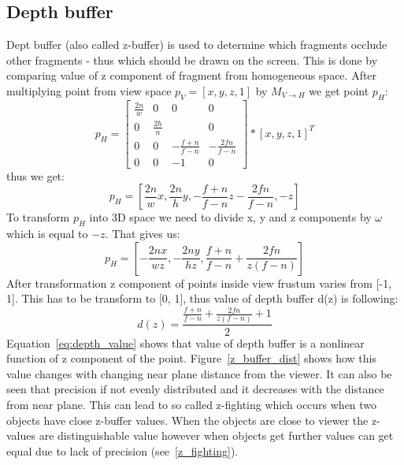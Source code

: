 \subsection{Depth buffer}
Dept buffer (also called z-buffer) is used to determine which fragments occlude other fragments - thus which should be drawn on the screen. This is done by comparing value of z component of fragment from homogeneous space. 
After multiplying point from view space $p_V = [x, y, z, 1]$  by $M_{V \to H}$ we get point $p_H$:
\begin{equation}
\label{eg:projection_transformation}
p_H =
\begin{bmatrix}
\frac{2n}{w} & 0            & 0                & 0                \\ 
0            & \frac{2h}{n} &                  & 0                 \\ 
0            & 0            & -\frac{f+n}{f-n} & -\frac{2fn}{f-n} \\ 
0            & 0            & -1               & 0
\end{bmatrix}
*[x, y, z, 1]^T
\end{equation}
thus we get:
\begin{equation}
\label{eg:after_perspective_projection}
p_H = [\frac{2n}{w}x, \frac{2n}{h}y, -\frac{f+n}{f-n}z - \frac{2fn}{f-n}, -z]
\end{equation}
To transform $p_H$ into 3D space we need to divide x, y and z components by $\omega$ which is equal to $-z$. That gives us:
\begin{equation}
\label{eg:after_perspective_projection}
p_H = [-\frac{2nx}{wz},-\frac{2ny}{hz}, \frac{f+n}{f-n} + \frac{2fn}{z(f-n)}]
\end{equation}
After transformation z component of points inside view frustum varies from [-1, 1]. This has to be transform to [0, 1], thus value of depth buffer d(z) is following:
\begin{equation}
\label{eq:depth_value}
d(z) = \frac{\frac{f+n}{f-n} + \frac{2fn}{z(f-n)} + 1}{2}
\end{equation}
Equation~\ref{eq:depth_value} shows that value of depth buffer is a nonlinear function of z component of the point. Figure~\ref{z_buffer_dist} shows how this value changes with changing near plane distance from the viewer. It can also be seen that precision if not evenly distributed and it decreases with the distance from near plane. This can lead to so called z-fighting which occurs when two objects have close z-buffer values. When the objects are close to viewer the z-values are distinguishable value however when objects get further values can get equal due to lack of precision (see~\ref{z_fighting}).

